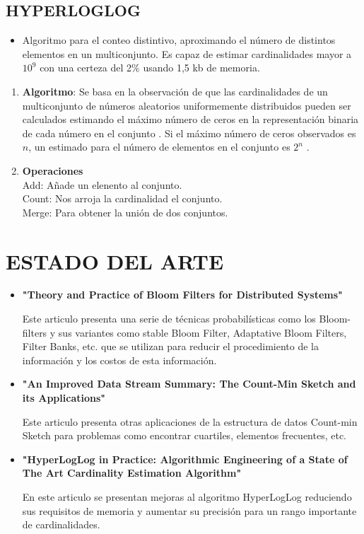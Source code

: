 \documentclass[journal]{IEEEtran}
\begin{document}
\begin{itemize}
\subsection{HYPERLOGLOG}
\begin{itemize}
    \item Algoritmo para el conteo distintivo, aproximando el n\'umero de distintos elementos en un multiconjunto. Es capaz de estimar cardinalidades mayor a $10^9$ con una certeza del 2\% usando 1,5 kb de memoria.
\end{itemize}
\begin{enumerate}
    \item {\bf Algoritmo}: Se basa en la observación de que las cardinalidades de un multiconjunto de n\'umeros aleatorios uniformemente distribuidos pueden ser calculados estimando el m\'aximo n\'umero de ceros en la representación binaria de cada n\'umero en el conjunto . Si el m\'aximo n\'umero de ceros observados es $n$, un estimado para el n\'umero de elementos en el conjunto es $2^n$ .
    \item {\bf Operaciones} \\
    Add: Añade un elenento al conjunto.\\
    Count: Nos arroja la cardinalidad el conjunto.\\
     Merge: Para obtener la unión de dos conjuntos.
\end{enumerate}
\end{itemize}

\section{ESTADO DEL ARTE}

\begin{itemize}

\item \textbf{"Theory and Practice of Bloom Filters for Distributed Systems"}

Este articulo presenta una serie de t\'ecnicas probabil\'isticas como los Bloom-filters y sus variantes como stable Bloom Filter, Adaptative Bloom Filters, Filter Banks, etc. que se utilizan para reducir el procedimiento de la informaci\'on y los costos de esta informaci\'on.\\

\item \textbf{"An Improved Data Stream Summary: The Count-Min Sketch and its Applications"}

Este articulo presenta otras aplicaciones de la estructura de datos Count-min Sketch para problemas como encontrar cuartiles, elementos frecuentes, etc.\\

\item \textbf{"HyperLogLog in Practice: Algorithmic Engineering of a State of The Art Cardinality Estimation Algorithm"}

En este articulo se presentan mejoras al algoritmo HyperLogLog reduciendo sus requisitos de memoria y aumentar su precisi\'on para un rango importante de cardinalidades.\\

\end{itemize}
\end{document}
